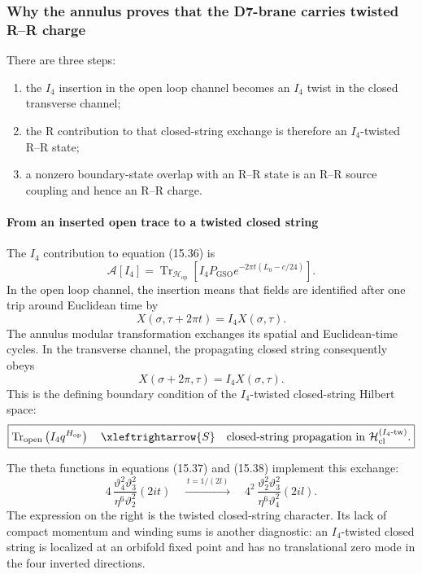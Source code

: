 \documentclass[
  10pt,
  a4paper,
  openany]{book}
\providecommand{\tightlist}{%
  \setlength{\itemsep}{0pt}\setlength{\parskip}{0pt}}
\begin{document}
\subsubsection{Why the annulus proves that the D7-brane carries twisted
R--R
charge}\label{why-the-annulus-proves-that-the-d7-brane-carries-twisted-rr-charge}

There are three steps:

\begin{enumerate}
\def\labelenumi{\arabic{enumi}.}
\tightlist
\item
  the \(I_4\) insertion in the open loop channel becomes an \(I_4\)
  twist in the closed transverse channel;
\item
  the R contribution to that closed-string exchange is therefore an
  \(I_4\)-twisted R--R state;
\item
  a nonzero boundary-state overlap with an R--R state is an R--R source
  coupling and hence an R--R charge.
\end{enumerate}

\paragraph{From an inserted open trace to a twisted closed
string}\label{from-an-inserted-open-trace-to-a-twisted-closed-string}

The \(I_4\) contribution to equation (15.36) is \[
\mathcal A[I_4]
=
\operatorname{Tr}_{\mathcal H_{\mathrm{op}}}
\left[
I_4P_{\mathrm{GSO}}
e^{-2\pi t(L_0-c/24)}
\right].
\] In the open loop channel, the insertion means that fields are
identified after one trip around Euclidean time by \[
X(\sigma,\tau+2\pi t)
=
I_4X(\sigma,\tau).
\] The annulus modular transformation exchanges its spatial and
Euclidean-time cycles. In the transverse channel, the propagating closed
string consequently obeys \[
X(\sigma+2\pi,\tau)
=
I_4X(\sigma,\tau).
\] This is the defining boundary condition of the \(I_4\)-twisted
closed-string Hilbert space: \[
\boxed{
\operatorname{Tr}_{\mathrm{open}}
\left(
I_4q^{H_{\mathrm{op}}}
\right)
\quad\xleftrightarrow{S}\quad
\text{closed-string propagation in }
\mathcal H_{\mathrm{cl}}^{(I_4\text{-tw})}.
}
\]

The theta functions in equations (15.37) and (15.38) implement this
exchange: \[
4\,
\frac{\vartheta_4^2\vartheta_3^2}
{\eta^6\vartheta_2^2}(2it)
\quad\xrightarrow{\,t=1/(2l)\,}\quad
4^2\,
\frac{\vartheta_2^2\vartheta_3^2}
{\eta^6\vartheta_4^2}(2il).
\] The expression on the right is the twisted closed-string character.
Its lack of compact momentum and winding sums is another diagnostic: an
\(I_4\)-twisted closed string is localized at an orbifold fixed point
and has no translational zero mode in the four inverted directions.
\end{document}
